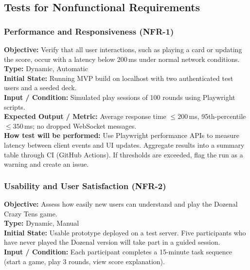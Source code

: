 \documentclass[12pt, titlepage]{article}
\begin{document}
\subsection{Tests for Nonfunctional Requirements}

    \subsubsection{Performance and Responsiveness (NFR-1)}
    \textbf{Objective:} Verify that all user interactions, such as playing a card or updating the score, occur with a latency below 200\,ms under normal network conditions. \\

    \textbf{Type:} Dynamic, Automatic \\

    \textbf{Initial State:} Running MVP build on localhost with two authenticated test users and a seeded deck. \\

    \textbf{Input / Condition:} Simulated play sessions of 100 rounds using Playwright scripts. \\

    \textbf{Expected Output / Metric:} Average response time $\leq 200$\,ms, 95th-percentile $\leq 350$\,ms; no dropped WebSocket messages. \\

    \textbf{How test will be performed:}
    Use Playwright performance APIs to measure latency between client events and UI updates. Aggregate results into a summary table through CI (GitHub Actions).
    If thresholds are exceeded, flag the run as a warning and create an issue.

    \subsubsection{Usability and User Satisfaction (NFR-2)}
    \textbf{Objective:} Assess how easily new users can understand and play the Dozenal Crazy Tens game. \\

    \textbf{Type:} Dynamic, Manual \\

    \textbf{Initial State:} Usable prototype deployed on a test server. Five participants who have never played the Dozenal version will take part in a guided session. \\

    \textbf{Input / Condition:} Each participant completes a 15-minute task sequence (start a game, play 3 rounds, view score explanation). \\
\end{document}
